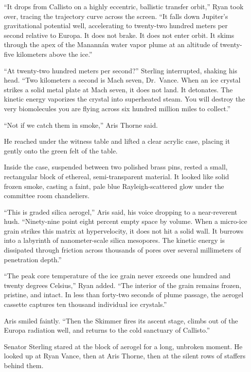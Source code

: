 \documentclass[12pt,twoside,openright]{book}
\begin{document}
``It drops from Callisto on a highly eccentric, ballistic transfer
orbit,'' Ryan took over, tracing the trajectory curve across the screen.
``It falls down Jupiter's gravitational potential well, accelerating to
twenty-two hundred meters per second relative to Europa. It does not
brake. It does not enter orbit. It skims through the apex of the
Manannán water vapor plume at an altitude of twenty-five kilometers
above the ice.''

``At twenty-two hundred meters per second?'' Sterling interrupted,
shaking his head. ``Two kilometers a second is Mach seven, Dr.~Vance.
When an ice crystal strikes a solid metal plate at Mach seven, it does
not land. It detonates. The kinetic energy vaporizes the crystal into
superheated steam. You will destroy the very biomolecules you are flying
across six hundred million miles to collect.''

``Not if we catch them in smoke,'' Aris Thorne said.

He reached under the witness table and lifted a clear acrylic case,
placing it gently onto the green felt of the table.

Inside the case, suspended between two polished brass pins, rested a
small, rectangular block of ethereal, semi-transparent material. It
looked like solid frozen smoke, casting a faint, pale blue
Rayleigh-scattered glow under the committee room chandeliers.

``This is graded silica aerogel,'' Aris said, his voice dropping to a
near-reverent hush. ``Ninety-nine point eight percent empty space by
volume. When a micro-ice grain strikes this matrix at hypervelocity, it
does not hit a solid wall. It burrows into a labyrinth of
nanometer-scale silica mesopores. The kinetic energy is dissipated
through friction across thousands of pores over several millimeters of
penetration depth.''

``The peak core temperature of the ice grain never exceeds one hundred
and twenty degrees Celsius,'' Ryan added. ``The interior of the grain
remains frozen, pristine, and intact. In less than forty-two seconds of
plume passage, the aerogel cassette captures ten thousand individual ice
crystals.''

Aris smiled faintly. ``Then the Skimmer fires its ascent stage, climbs
out of the Europa radiation well, and returns to the cold sanctuary of
Callisto.''

Senator Sterling stared at the block of aerogel for a long, unbroken
moment. He looked up at Ryan Vance, then at Aris Thorne, then at the
silent rows of staffers behind them.
\end{document}
